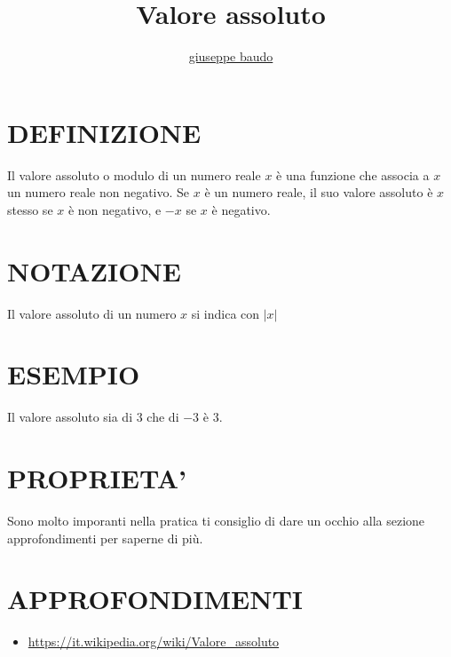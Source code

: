 \documentclass[a4paper,10pt]{article}
\title{Valore assoluto}
\author{\href{http://www.baudo.hol.es}{giuseppe baudo}}
\begin{document}
\maketitle

\section{DEFINIZIONE}
Il valore assoluto o modulo di un numero reale $x$ è una funzione che associa a $x$ un numero reale non negativo. Se $x$
è un numero reale, il suo valore assoluto è $x$ stesso se $x$ è non negativo, e $-x$ se $x$ è negativo.

\section{NOTAZIONE}
Il valore assoluto di un numero $x$ si indica con $|x|$

\section{ESEMPIO}
Il valore assoluto sia di $3$ che di $-3$ è $3$. 

\section{PROPRIETA'}
Sono molto imporanti nella pratica ti consiglio di dare un occhio alla sezione approfondimenti per saperne di più.

\section{APPROFONDIMENTI}
\begin{itemize}
 \item \href{https://it.wikipedia.org/wiki/Valore_assoluto}{https://it.wikipedia.org/wiki/Valore_assoluto}
\end{itemize}
\end{document}
